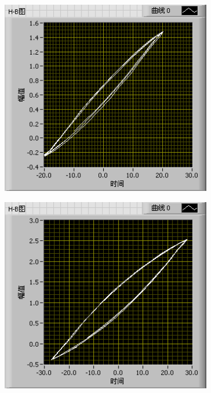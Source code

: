 \documentclass{ctexart}
\begin{document}
\begin{figure}[H]
  \centering
  \begin{subfigure}{0.32\linewidth}
    \includegraphics[width=\linewidth]{LabVIEW使用基础/铁材料的磁滞现象和磁滞回线/3V.png}
  \end{subfigure}
  \begin{subfigure}{0.32\linewidth}
    \includegraphics[width=\linewidth]{LabVIEW使用基础/铁材料的磁滞现象和磁滞回线/4V.png}

\end{subfigure}
\end{figure}
\end{document}
